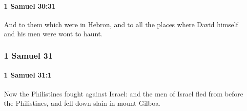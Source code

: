 		\paragraph{1 Samuel 30:31} %
			\label{1SAMUEL-30-31}

			And to them which were in Hebron, and to all the places where David himself and his men were wont to haunt.

	\subsubsection{1 Samuel 31} %
		\label{1SAMUEL-31}

		\paragraph{1 Samuel 31:1} %
			\label{1SAMUEL-31-1}

			Now the Philistines fought against Israel: and the men of Israel fled from before the Philistines, and fell down slain in mount Gilboa.

